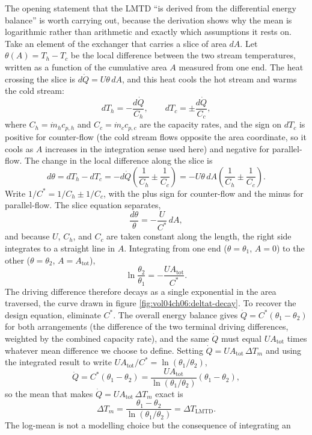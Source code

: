 The opening statement that the LMTD ``is derived from the differential energy
balance'' is worth carrying out, because the derivation shows why the mean is
logarithmic rather than arithmetic and exactly which assumptions it rests on. Take
an element of the exchanger that carries a slice of area $dA$. Let $\theta(A) = T_h
- T_c$ be the local difference between the two stream temperatures, written as a
function of the cumulative area $A$ measured from one end. The heat crossing the
slice is $d\dot{Q} = U\theta\,dA$, and this heat cools the hot stream and warms the
cold stream:
\[
dT_h = -\frac{d\dot{Q}}{C_h}, \qquad dT_c = \pm\frac{d\dot{Q}}{C_c},
\]
where $C_h = \dot{m}_h c_{p,h}$ and $C_c = \dot{m}_c c_{p,c}$ are the capacity
rates, and the sign on $dT_c$ is positive for counter-flow (the cold stream flows
opposite the area coordinate, so it cools as $A$ increases in the integration
sense used here) and negative for parallel-flow. The change in the local
difference along the slice is
\[
d\theta = dT_h - dT_c = -d\dot{Q}\left(\frac{1}{C_h} \pm \frac{1}{C_c}\right)
= -U\theta\,dA\left(\frac{1}{C_h} \pm \frac{1}{C_c}\right).
\]
Write $1/C^\ast = 1/C_h \pm 1/C_c$, with the plus sign for counter-flow and the
minus for parallel-flow. The slice equation separates,
\[
\frac{d\theta}{\theta} = -\frac{U}{C^\ast}\,dA,
\]
and because $U$, $C_h$, and $C_c$ are taken constant along the length, the right
side integrates to a straight line in $A$. Integrating from one end ($\theta =
\theta_1$, $A = 0$) to the other ($\theta = \theta_2$, $A = A_{\text{tot}}$),
\[
\ln\frac{\theta_2}{\theta_1} = -\frac{U A_{\text{tot}}}{C^\ast}.
\]
The driving difference therefore decays as a single exponential in the area
traversed, the curve drawn in figure \ref{fig:vol04ch06:deltat-decay}. To recover
the design equation, eliminate $C^\ast$. The overall energy balance gives
$\dot{Q} = C^\ast(\theta_1 - \theta_2)$ for both arrangements (the difference of
the two terminal driving differences, weighted by the combined capacity rate), and
the same $\dot{Q}$ must equal $U A_{\text{tot}}$ times whatever mean difference we
choose to define. Setting $\dot{Q} = U A_{\text{tot}}\,\Delta T_m$ and using the
integrated result to write $U A_{\text{tot}}/C^\ast = \ln(\theta_1/\theta_2)$,
\[
\dot{Q} = C^\ast(\theta_1 - \theta_2)
= \frac{U A_{\text{tot}}}{\ln(\theta_1/\theta_2)}(\theta_1 - \theta_2),
\]
so the mean that makes $\dot{Q} = U A_{\text{tot}}\,\Delta T_m$ exact is
\[
\Delta T_m = \frac{\theta_1 - \theta_2}{\ln(\theta_1/\theta_2)}
= \Delta T_{\text{LMTD}}.
\]
The log-mean is not a modelling choice but the consequence of integrating an
